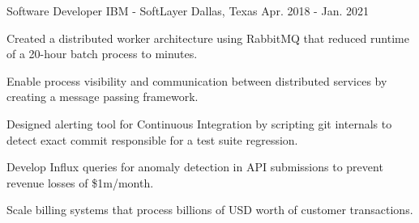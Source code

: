 
\begin{cventries}
	
	\cventry
	{Software Developer}
	{IBM - SoftLayer}
	{Dallas, Texas}
	{Apr. 2018 - Jan. 2021}
	{
		\begin{cvitems}
			\item {Created a distributed worker architecture using RabbitMQ that reduced runtime of a 20-hour batch process to minutes.}
			\item {Enable process visibility and communication between distributed services by creating a message passing framework.}
			\item {Designed alerting tool for Continuous Integration by scripting git internals to detect exact commit responsible for a test suite regression.}
			\item {Develop Influx queries for anomaly detection in API submissions to prevent revenue losses of \$1m/month.}
			\item {Scale billing systems that process billions of USD worth of customer transactions.}
		\end{cvitems}
	}
	
%	


\end{cventries}
